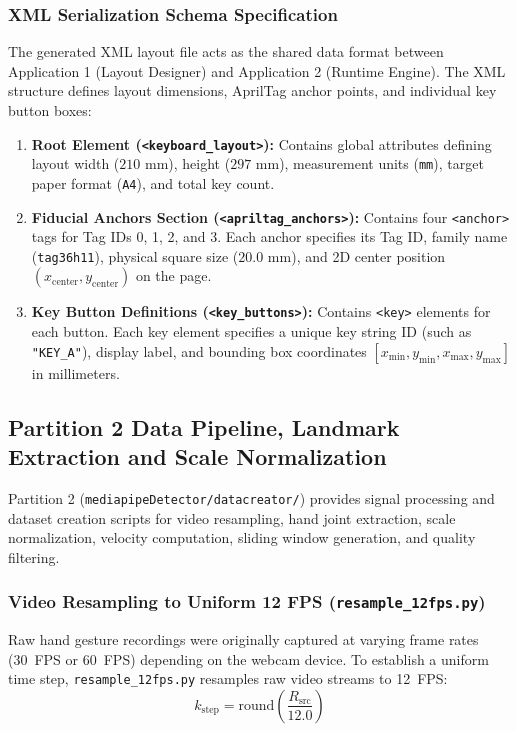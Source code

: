 \subsubsection{XML Serialization Schema Specification}
The generated XML layout file acts as the shared data format between Application 1 (Layout Designer) and Application 2 (Runtime Engine). The XML structure defines layout dimensions, AprilTag anchor points, and individual key button boxes:
\begin{enumerate}
    \item \textbf{Root Element (\texttt{<keyboard\_layout>}):} Contains global attributes defining layout width ($210\text{ mm}$), height ($297\text{ mm}$), measurement units (\texttt{mm}), target paper format (\texttt{A4}), and total key count.
    \item \textbf{Fiducial Anchors Section (\texttt{<apriltag\_anchors>}):} Contains four \texttt{<anchor>} tags for Tag IDs 0, 1, 2, and 3. Each anchor specifies its Tag ID, family name (\texttt{tag36h11}), physical square size ($20.0\text{ mm}$), and 2D center position $(x_{\text{center}}, y_{\text{center}})$ on the page.
    \item \textbf{Key Button Definitions (\texttt{<key\_buttons>}):} Contains \texttt{<key>} elements for each button. Each key element specifies a unique key string ID (such as \texttt{"KEY\_A"}), display label, and bounding box coordinates $[x_{\min}, y_{\min}, x_{\max}, y_{\max}]$ in millimeters.
\end{enumerate}

\subsection{Partition 2 Data Pipeline, Landmark Extraction and Scale Normalization}
Partition 2 (\texttt{mediapipeDetector/datacreator/}) provides signal processing and dataset creation scripts for video resampling, hand joint extraction, scale normalization, velocity computation, sliding window generation, and quality filtering.

\subsubsection{Video Resampling to Uniform 12 FPS (\texttt{resample\_12fps.py})}
Raw hand gesture recordings were originally captured at varying frame rates (30~FPS or 60~FPS) depending on the webcam device. To establish a uniform time step, \texttt{resample\_12fps.py} resamples raw video streams to 12~FPS:
\begin{equation}
k_{\text{step}} = \text{round}\left(\frac{R_{\text{src}}}{12.0}\right)
\label{eq:resample_step}
\end{equation}

